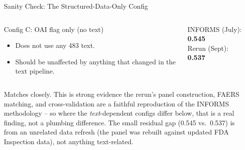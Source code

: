 \documentclass[aspectratio=169,10pt]{beamer}
\newcommand{\highlight}[1]{{\color{ncsuRed}\textbf{#1}}}
\begin{document}
\begin{frame}{Sanity Check: The Structured-Data-Only Config}
\begin{columns}[T]
\begin{block}{Config C: OAI flag only (no text)}
\begin{itemize}
  \item Does not use any 483 text.
  \item Should be unaffected by anything that changed in the text pipeline.
\end{itemize}
\end{block}
\begin{center}
{\small INFORMS (July):} \highlight{0.545}\\[4pt]
{\small Rerun (Sept):} \highlight{0.537}
\end{center}
\end{columns}
\vspace{10pt}
Matches closely. This is strong evidence the rerun's panel construction, FAERS matching, and
cross-validation are a faithful reproduction of the INFORMS methodology -- so where the
\emph{text}-dependent configs differ below, that is a real finding, not a plumbing difference.
The small residual gap (0.545 vs.\ 0.537) is from an unrelated data refresh (the panel was
rebuilt against updated FDA Inspection data), not anything text-related.
\end{frame}
\end{document}
